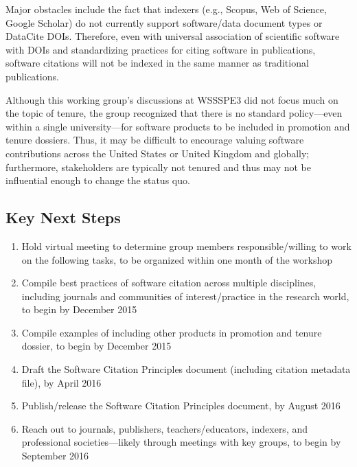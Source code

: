 Major obstacles include the fact that indexers (e.g., Scopus, Web of Science,  Google Scholar) do not currently support software/data document types or  DataCite DOIs.
Therefore, even with universal association of scientific software with DOIs  and standardizing practices for citing software in publications, software citations will not be indexed in the same manner as traditional publications.

Although this working group's discussions at WSSSPE3 did not focus much on the topic of tenure, the group recognized that there is no standard policy---even within a single university---for software products to be included in promotion and tenure dossiers.
Thus, it may be difficult to encourage valuing software contributions across the United States or United Kingdom and globally; furthermore, stakeholders are typically not tenured and thus may not be influential enough to change the status quo.

\subsection{Key Next Steps}
\label{SC:next-steps}

\begin{enumerate}
\item Hold virtual meeting to determine group members responsible\slash willing to work on the following tasks, to be organized within one month of the workshop
\item Compile best practices of software citation across multiple disciplines, including journals and communities of interest\slash practice in the research world, to begin by December 2015
\item Compile examples of including other products in promotion and tenure dossier, to begin by December 2015
\item Draft the Software Citation Principles document (including citation metadata file), by April 2016
\item Publish\slash release the Software Citation Principles document, by August 2016
\item Reach out to journals, publishers, teachers\slash educators, indexers, and professional societies---likely through meetings with key groups, to begin by September 2016

\end{enumerate}

